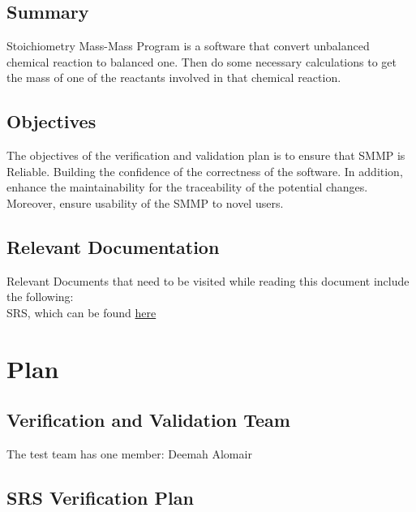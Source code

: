 \documentclass[12pt, titlepage]{article}
\begin{document}
\subsection{Summary}

Stoichiometry Mass-Mass Program is a software that convert unbalanced chemical
reaction to balanced one. Then do some necessary calculations to get the mass of
one of the reactants involved in that chemical reaction.

\subsection{Objectives}


The objectives of the verification and validation plan is to ensure that SMMP is
Reliable. Building the confidence of the correctness of the software. In addition, 
enhance the maintainability for the traceability of the potential changes. Moreover,
ensure usability of the SMMP to novel users.

\subsection{Relevant Documentation}

Relevant Documents that need to be visited while reading this document include
the following:\\

 SRS, which can be found
\href{https://github.com/deemaalomair1/CAS741_project/tree/master/docs/SRS}{here}
 

\section{Plan}


\subsection{Verification and Validation Team}

The test team has one member: Deemah Alomair


\subsection{SRS Verification Plan}
\end{document}
